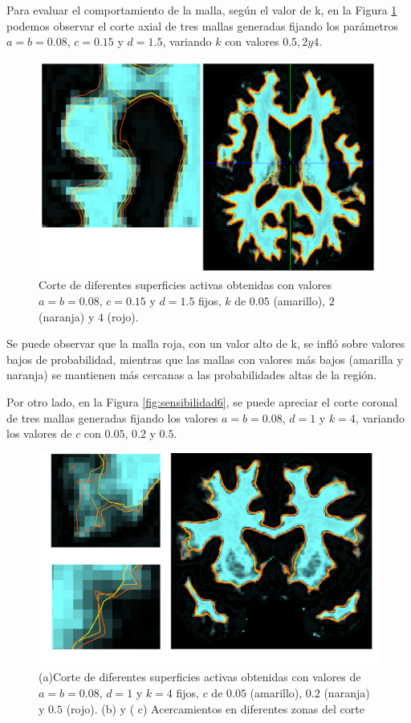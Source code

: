 Para evaluar el comportamiento de la malla, según el valor de k, en la Figura \ref{fig:sensibilidad8} podemos observar el corte axial de tres mallas generadas fijando los parámetros $a=b=0.08$, $c=0.15$ y $d=1.5$, variando $k$ con valores $0.5, 2 y 4$.

\begin{figure}[H]
	\centering
	\includegraphics[scale=0.05]{images/sensibilidad8.jpg}
	\caption{Corte de diferentes superficies activas obtenidas con valores $a=b=0.08$, $c=0.15$ y $d=1.5$ fijos,  $k$ de $0.05$ (amarillo), $2$ (naranja) y $4$ (rojo). }
	\label{fig:sensibilidad8}
\end{figure}

Se puede observar que la malla roja, con un valor alto de k, se infló sobre valores bajos de probabilidad, mientras que las mallas con valores más bajos (amarilla y naranja) se mantienen más cercanas a las probabilidades altas de la región.

Por otro lado, en la Figura \ref{fig:sensibilidad6}, se puede apreciar el corte coronal de tres mallas generadas fijando los valores $a=b=0.08$, $d=1$ y $k=4$,  variando los valores de $c$ con $0.05$, $0.2$ y $0.5$.

\begin{figure}[H]
	\centering
	\includegraphics[scale=0.05]{images/sensibilidad9.jpg}
	\caption{(a)Corte de diferentes superficies activas obtenidas con valores de $a=b=0.08$, $d=1$ y $k=4$ fijos, $c$ de $0.05$ (amarillo), $0.2$ (naranja) y $0.5$ (rojo). (b) y ( c) Acercamientos en diferentes zonas del corte}
	\label{fig:sensibilidad9}
\end{figure}

